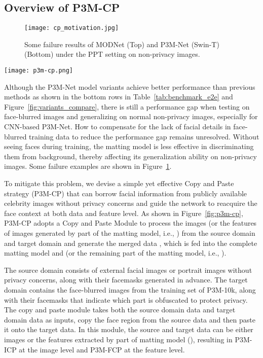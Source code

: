 \documentclass[twocolumn]{svjour3}
\begin{document}
\subsection{Overview of P3M-CP}

\begin{figure}
    \centering
    \texttt{[image: cp\_motivation.jpg]}
    \caption{Some failure results of MODNet (Top) and P3M-Net (Swin-T) (Bottom) under the PPT setting on non-privacy images.}
    \label{fig:p3m-cp-motivation}
\end{figure}

\begin{figure*}
    \centering
    \texttt{[image: p3m-cp.png]}
    \caption{The pipeline of P3M-CP. P3M-CP can be applied at the image level or the feature level (as described above).}
    \label{fig:p3m-cp}
\end{figure*}


Although the P3M-Net model variants achieve better performance than previous methods as shown in the bottom rows in Table~\ref{tab:benchmark_e2e} and Figure~\ref{fig:variants_compare}, there is still a performance gap when testing on face-blurred images and generalizing on normal non-privacy images, especially for CNN-based P3M-Net. How to compensate for the lack of facial details in face-blurred training data to reduce the performance gap remains unresolved. Without seeing faces during training, the matting model is less effective in discriminating them from background, thereby affecting its generalization ability on non-privacy images. Some failure examples are shown in Figure~\ref{fig:p3m-cp-motivation}. 

To mitigate this problem, we devise a simple yet effective Copy and Paste strategy (P3M-CP) that can borrow facial information from publicly available celebrity images without privacy concerns and guide the network to reacquire the face context at both data and feature level. As shown in Figure~\ref{fig:p3m-cp}, P3M-CP adopts a Copy and Paste Module  to process the images (or the features of images generated by part of the matting model, i.e., ) from the source domain  and target domain  and generate the merged data , which is fed into the complete matting model  and  (or the remaining part of the matting model, i.e., ).

The source domain  consists of external facial images or portrait images  without privacy concerns, along with their facemasks  generated in advance. The target domain  contains the face-blurred images  from the training set of P3M-10k, along with their facemasks  that indicate which part is obfuscated to protect privacy. The copy and paste module  takes both the source domain data and target domain data as inputs, copy the face region from the source data and then paste it onto the target data. In this module, the source and target data can be either images or the features extracted by part of matting model (), resulting in P3M-ICP at the image level and P3M-FCP at the feature level.
\end{document}
